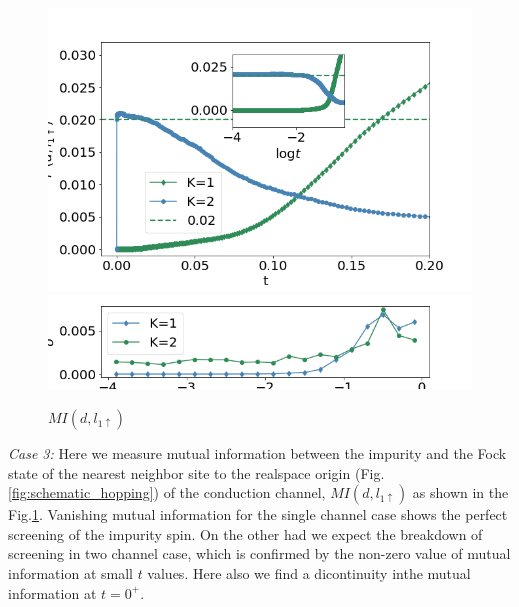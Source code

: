 \documentclass[reprint,prb,superscriptaddress]{revtex4-2}
\begin{document}
\begin{figure}
\includegraphics[scale=0.4]{plt/A_I2_ch12_['d','l1_up']}
\includegraphics[scale=0.4]{plt/errorbar_A_I2_ch12_['d','l1_up']}
\caption{$MI(d,l_{1\uparrow})$}
\label{fig:MI_d_l1}
\end{figure}
\par \textit{Case 3:} Here we measure mutual information between the impurity and the Fock state of the nearest neighbor site to the realspace origin (Fig.\ref{fig:schematic_hopping}) of the conduction channel, $MI(d,l_{1\uparrow})$ as shown in the Fig.\ref{fig:MI_d_l1}. Vanishing mutual information for the single channel case shows the perfect screening of the impurity spin. On the other had we expect the breakdown of screening in two channel case, which is confirmed by the non-zero value of mutual information at small $t$ values. Here also we find a dicontinuity inthe mutual information at $t=0^+$.
\end{document}
